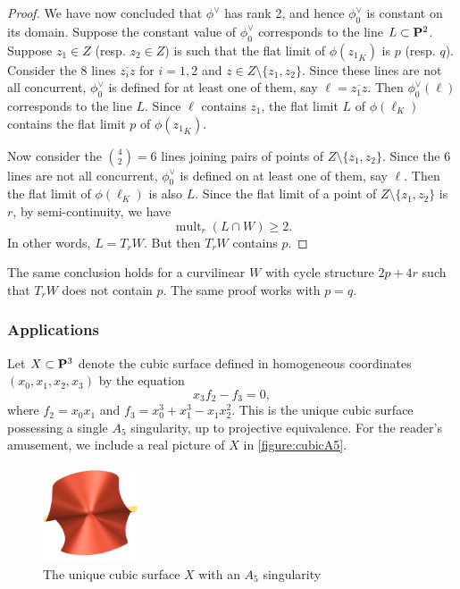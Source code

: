 \documentclass[11pt,reqno, letterpaper]{amsart}
\DeclareMathOperator{\mult}{mult}
\numberwithin{equation}{section}
\begin{document}
\begin{proof}
  We have now concluded that $\phi^\vee$ has rank 2, and hence $\phi_0^\vee$ is constant on its domain.
  Suppose the constant value of $\phi_0^\vee$ corresponds to the line $L \subset \P^2$.
  Suppose $z_1 \in Z$ (resp. $z_2 \in Z$) is such that the flat limit of $\phi({z_1}_K)$ is $p$ (resp. $q$).
  Consider the 8 lines $\overline {z_i z}$ for $i= 1,2$ and $z \in Z \setminus \{z_1,z_2\}$.
  Since these lines are not all concurrent, $\phi_0^\vee$ is defined for at least one of them, say $\ell = \overline {z_1 z}$.
  Then $\phi^\vee_0(\ell)$ corresponds to the line $L$.
  Since $\ell$ contains $z_1$, the flat limit $L$ of $\phi(\ell_K)$ contains the flat limit $p$ of $\phi({z_1}_K)$.

  Now consider the ${4 \choose 2} = 6$ lines joining pairs of points of $Z \setminus \{z_1,z_2\}$.
  Since the 6 lines are not all concurrent, $\phi_0^\vee$ is defined on at least one of them, say $\ell$.
  Then the flat limit of $\phi(\ell_K)$ is also $L$.
  Since the flat limit of a point of $Z \setminus \{z_1,z_2\}$ is $r$, by semi-continuity, we have
  \[ \mult_r(L \cap W) \geq 2.\]
  In other words, $L = T_rW$.
  But then $T_rW$ contains $p$.
\end{proof}
\begin{remark}\label{prop:2p4r}
  The same conclusion holds for a curvilinear $W$ with cycle structure $2p + 4r$ such that $T_rW$ does not contain $p$.
  The same proof works with $p = q$.
\end{remark}

\subsubsection{Applications}
Let $X \subset \P^{3}$ denote the cubic surface defined in homogeneous coordinates $\left(x_{0}, x_{1}, x_{2}, x_{3}\right)$ by the equation \[x_{3}f_{2} - f_{3} = 0,\] where $f_{2} = x_{0}x_{1}$ and $f_{3} = x_{0}^3 + x_{1}^{3}-x_{1}x_{2}^{2}$.
This is the unique cubic surface possessing a single $A_5$ singularity, up to projective equivalence.
For the reader's amusement, we include a real picture of $X$ in \autoref{figure:cubicA5}.
\begin{figure}
  \centering
  \includegraphics[width=0.25\textwidth]{cubicA5}
  \caption{The unique cubic surface $X$ with an $A_5$ singularity}
  \label{figure:cubicA5}
\end{figure}
\end{document}
